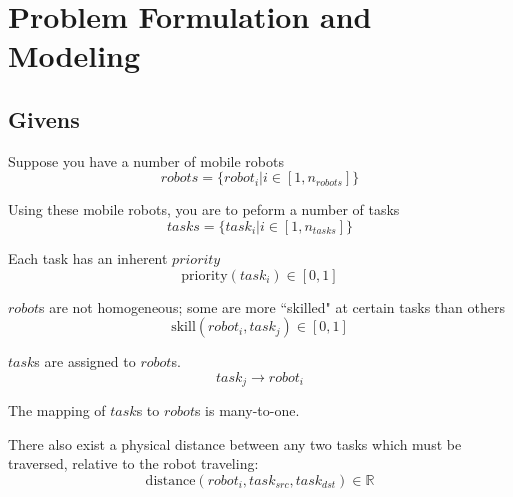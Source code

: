 \documentclass[a4paper]{article}
\begin{document}
\section{Problem Formulation and Modeling}


%
%


\subsection{Givens}

Suppose you have a number of mobile robots
$$\mathit{robots} = \{ \mathit{robot}_i | i \in [1, n_\mathit{robots}] \}$$

Using these mobile robots, you are to peform a number of tasks
$$\mathit{tasks} = \{ \mathit{task}_i | i \in [1, n_\mathit{tasks}] \}$$

Each task has an inherent $\mathit{priority}$
$$\text{priority}(\mathit{task}_i) \in [0 ,1]$$

$\mathit{robot}$s are not homogeneous; some are more ``skilled" at certain tasks than others
$$\text{skill}(\mathit{robot}_i, \mathit{task}_j) \in [0 ,1]$$

$\mathit{task}$s are assigned to $\mathit{robot}$s.
$$\mathit{task}_j \rightarrow \mathit{robot}_i$$

The mapping of $task$s to $robot$s is many-to-one.

There also exist a physical distance between any two tasks which must be traversed, relative to the robot traveling:
$$
\text{distance}(\mathit{robot}_i, \mathit{task}_{src}, \mathit{task}_{dst}) \in \mathbb{R}
$$
\end{document}
